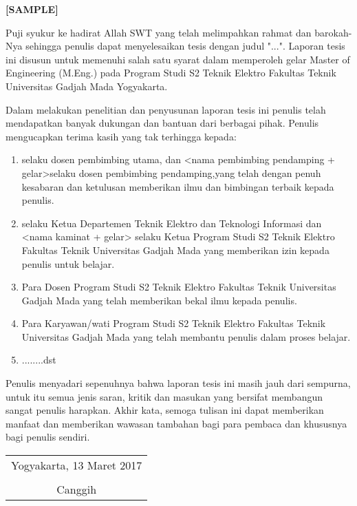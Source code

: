 \begin{center}
	\textbf{[SAMPLE]}
\end{center}

Puji syukur ke hadirat Allah SWT yang telah melimpahkan rahmat dan barokah-Nya sehingga penulis dapat menyelesaikan tesis dengan judul "...". Laporan tesis ini disusun untuk memenuhi salah satu syarat dalam memperoleh gelar Master of Engineering (M.Eng.) pada Program Studi S2 Teknik Elektro Fakultas Teknik Universitas Gadjah Mada Yogyakarta.


Dalam melakukan penelitian dan penyusunan laporan tesis ini penulis telah mendapatkan banyak dukungan dan bantuan dari berbagai pihak. Penulis mengucapkan terima kasih yang tak terhingga kepada:

\begin{enumerate}
	\item <nama pembimbing utama + gelar> selaku dosen pembimbing utama, dan <nama pembimbing pendamping + gelar>selaku dosen pembimbing pendamping,yang telah dengan penuh kesabaran dan ketulusan memberikan ilmu dan bimbingan terbaik kepada penulis.
	
	\item <nama kaprodi + gelar> selaku Ketua Departemen Teknik Elektro dan Teknologi Informasi dan <nama kaminat + gelar> selaku Ketua Program Studi S2 Teknik Elektro Fakultas Teknik Universitas Gadjah Mada yang memberikan izin kepada penulis untuk belajar.
	
	\item Para Dosen Program Studi S2 Teknik Elektro Fakultas Teknik Universitas Gadjah Mada yang telah memberikan bekal ilmu kepada penulis.
	
	\item Para Karyawan/wati Program Studi S2 Teknik Elektro Fakultas Teknik Universitas Gadjah Mada yang telah membantu penulis dalam proses belajar.
	
	\item ........dst

\end{enumerate}

Penulis menyadari sepenuhnya bahwa laporan tesis ini masih jauh dari sempurna, untuk itu semua jenis saran, kritik dan masukan yang bersifat membangun sangat penulis harapkan. Akhir kata, semoga tulisan ini dapat memberikan manfaat dan memberikan wawasan tambahan bagi para pembaca dan khususnya bagi penulis sendiri.

\begin{flushright}
	\begin{tabular}{c}
		Yogyakarta, 13 Maret 2017 \\
		\vspace{1cm} \\
		Canggih
	\end{tabular}
\end{flushright}